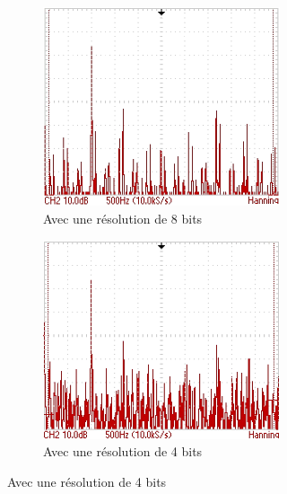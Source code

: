 \documentclass{article}
\begin{document}
\begin{figure}[h!]
	\centering
	\begin{subfigure}[b]{\textwidth}
		\begin{subfigure}[b]{.45\textwidth}
			\centering
			\includegraphics[width=\textwidth]{data/TEK0013_}
			\caption{Avec une résolution de 8 bits}
			\label{fig:sp_8}
		\end{subfigure}
		\hfill
		\begin{subfigure}[b]{.45\textwidth}
			\centering
			\includegraphics[width=\textwidth]{data/TEK0014_}
			\caption{Avec une résolution de 4 bits}
			\label{fig:sp_4}
		\end{subfigure}
	\end{subfigure}
	\caption{}
\end{figure}
\end{document}
